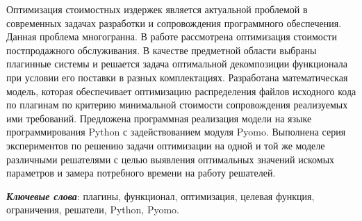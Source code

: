 Оптимизация стоимостных издержек является актуальной проблемой в современных задачах разработки и сопровождения программного обеспечения. Данная проблема многогранна. В работе рассмотрена оптимизация стоимости постпродажного обслуживания. В качестве предметной области выбраны плагинные системы и решается задача оптимальной декомпозиции функционала при условии его поставки в разных комплектациях. Разработана математическая модель, которая обеспечивает оптимизацию распределения файлов исходного кода по плагинам по критерию минимальной стоимости сопровождения реализуемых ими требований. Предложена программная реализация модели на языке программирования Python с задействованием модуля Pyomo. Выполнена серия экспериментов по решению задачи оптимизации на одной и той же моделе различными решателями с целью выявления оптимальных значений искомых параметров и замера потребного времени на работу решателей.

\textbf{\textit{Ключевые слова}}: плагины, функционал, оптимизация, целевая функция, ограничения, решатели, Python, Pyomo.
